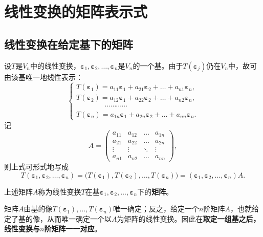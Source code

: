 \section{线性变换的矩阵表示式}

\subsection{线性变换在给定基下的矩阵}
设$T$是$V_n$中的线性变换，$\boldsymbol{\varepsilon}_1,\boldsymbol{\varepsilon}_2,\dots,\boldsymbol{\varepsilon}_n$是$V_n$的一个基。由于$T(\boldsymbol{\varepsilon}_j)$仍在$V_n$中，故可由该基唯一地线性表示：
\[
\begin{cases}
T(\boldsymbol{\varepsilon}_1)=a_{11}\boldsymbol{\varepsilon}_1+a_{21}\boldsymbol{\varepsilon}_2+\dots+a_{n1}\boldsymbol{\varepsilon}_n,\\
T(\boldsymbol{\varepsilon}_2)=a_{12}\boldsymbol{\varepsilon}_1+a_{22}\boldsymbol{\varepsilon}_2+\dots+a_{n2}\boldsymbol{\varepsilon}_n,\\
\qquad\qquad\cdots\cdots\cdots\cdots\\
T(\boldsymbol{\varepsilon}_n)=a_{1n}\boldsymbol{\varepsilon}_1+a_{2n}\boldsymbol{\varepsilon}_2+\dots+a_{nn}\boldsymbol{\varepsilon}_n .
\end{cases}
\]
记
\[
A=\begin{pmatrix}
a_{11}&a_{12}&\dots&a_{1n}\\
a_{21}&a_{22}&\dots&a_{2n}\\
\vdots&\vdots&\ddots&\vdots\\
a_{n1}&a_{n2}&\dots&a_{nn}
\end{pmatrix},
\]
则上式可形式地写成
\[
T(\boldsymbol{\varepsilon}_1,\boldsymbol{\varepsilon}_2,\dots,\boldsymbol{\varepsilon}_n)
=\bigl(T(\boldsymbol{\varepsilon}_1),T(\boldsymbol{\varepsilon}_2),\dots,T(\boldsymbol{\varepsilon}_n)\bigr)
=(\boldsymbol{\varepsilon}_1,\boldsymbol{\varepsilon}_2,\dots,\boldsymbol{\varepsilon}_n)A .
\]

\begin{definition}[线性变换的矩阵]
上述矩阵$A$称为线性变换$T$在基$\boldsymbol{\varepsilon}_1,\boldsymbol{\varepsilon}_2,\dots,\boldsymbol{\varepsilon}_n$下的\textbf{矩阵}。
\end{definition}

矩阵$A$由基的像$T(\boldsymbol{\varepsilon}_1),\dots,T(\boldsymbol{\varepsilon}_n)$唯一确定；反之，给定一个$n$阶矩阵$A$，也就给定了基的像，从而唯一确定一个以$A$为矩阵的线性变换。因此在\textbf{取定一组基之后，线性变换与$n$阶矩阵一一对应}。


